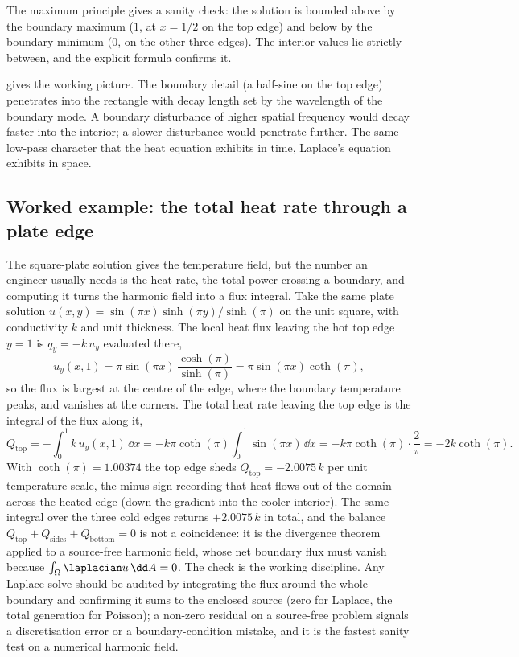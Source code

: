 The maximum principle gives a sanity check: the solution is bounded
above by the boundary maximum ($1$, at $x = 1/2$ on the top edge)
and below by the boundary minimum ($0$, on the other three
edges). The interior values lie strictly between, and the
explicit formula confirms it.



 gives the working picture.
The boundary detail (a half-sine on the top edge) penetrates into
the rectangle with decay length set by the wavelength of the
boundary mode. A boundary disturbance of higher spatial frequency
would decay faster into the interior; a slower disturbance would
penetrate further. The same low-pass character that the heat
equation exhibits in time, Laplace's equation exhibits in space.

\subsection{Worked example: the total heat rate through a plate edge}

The square-plate solution gives the temperature field, but the number
an engineer usually needs is the heat rate, the total power crossing a
boundary, and computing it turns the harmonic field into a flux
integral. Take the same plate solution $u(x, y) = \sin(\pi x)
\sinh(\pi y)/\sinh(\pi)$ on the unit square, with conductivity $k$ and
unit thickness. The local heat flux leaving the hot top edge $y = 1$
is $q_{y} = -k\, u_{y}$ evaluated there,
\[
u_{y}(x, 1) = \pi\sin(\pi x)\,\frac{\cosh(\pi)}{\sinh(\pi)}
            = \pi\sin(\pi x)\coth(\pi),
\]
so the flux is largest at the centre of the edge, where the boundary
temperature peaks, and vanishes at the corners. The total heat rate
leaving the top edge is the integral of the flux along it,
\[
Q_{\text{top}} = -\int_{0}^{1} k\, u_{y}(x, 1)\,\dd x
        = -k\pi\coth(\pi)\int_{0}^{1}\sin(\pi x)\,\dd x
        = -k\pi\coth(\pi)\cdot\frac{2}{\pi}
        = -2k\coth(\pi).
\]
With $\coth(\pi) = 1.00374$ the top edge sheds $Q_{\text{top}} =
-2.0075\,k$ per unit temperature scale, the minus sign recording that
heat flows out of the domain across the heated edge (down the gradient
into the cooler interior). The same integral over the three cold edges
returns $+2.0075\,k$ in total, and the balance $Q_{\text{top}} +
Q_{\text{sides}} + Q_{\text{bottom}} = 0$ is not a coincidence: it is
the divergence theorem applied to a source-free harmonic field, whose
net boundary flux must vanish because $\int_{\Omega}\laplacian u\,\dd A
= 0$. The check is the working discipline. Any Laplace solve should be
audited by integrating the flux around the whole boundary and
confirming it sums to the enclosed source (zero for Laplace, the total
generation for Poisson); a non-zero residual on a source-free problem
signals a discretisation error or a boundary-condition mistake, and it
is the fastest sanity test on a numerical harmonic field.

